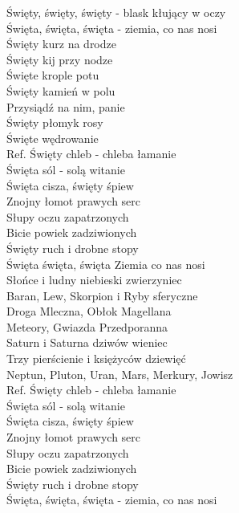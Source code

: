 
Święty, święty, święty - blask kłujący w oczy  \\
Święta, święta, święta - ziemia, co nas nosi \\
\hops
Święty kurz na drodze \\
Święty kij przy nodze \\
Święte krople potu \\
Święty kamień w polu  \\
Przysiądź na nim, panie  \\
Święty płomyk rosy  \\
Święte wędrowanie  \\
\hops
Ref. Święty chleb - chleba łamanie\\
 Święta sól - solą witanie\tab{}\\
 Święta cisza, święty śpiew\tab{} \\
 Znojny łomot prawych serc \\
 Słupy oczu zapatrzonych \tab{} \\
 Bicie powiek zadziwionych\\
 Święty ruch i drobne stopy\\
 Święta święta, święta Ziemia co nas nosi\\
\hops
Słońce i ludny niebieski zwierzyniec\tab{}\\
Baran, Lew, Skorpion i Ryby sferyczne\tab{}\\
Droga Mleczna, Obłok Magellana\tab{}\\
Meteory, Gwiazda Przedporanna\tab{} \\
Saturn i Saturna dziwów wieniec\tab{}\\
Trzy pierścienie i księżyców dziewięć  \tab{} \\
Neptun, Pluton, Uran, Mars, Merkury, Jowisz   \tab{}\\
\hops
Ref. Święty chleb - chleba łamanie\\
 Święta sól - solą witanie \\
 Święta cisza, święty śpiew \\
 Znojny łomot prawych serc \\
 Słupy oczu zapatrzonych \\
 Bicie powiek zadziwionych \\
 Święty ruch i drobne stopy \\
 Święta, święta, święta - ziemia, co nas nosi